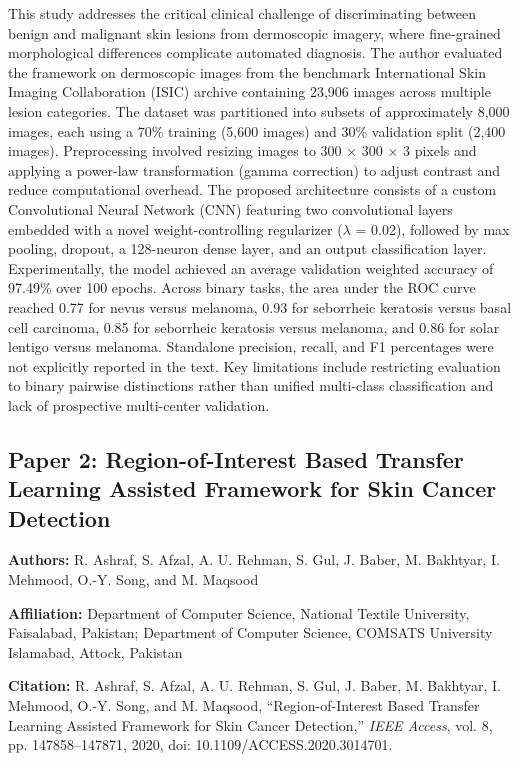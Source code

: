 \documentclass[conference]{IEEEtran}
\begin{document}
This study addresses the critical clinical challenge of discriminating between benign and malignant skin lesions from dermoscopic imagery, where fine-grained morphological differences complicate automated diagnosis. The author evaluated the framework on dermoscopic images from the benchmark International Skin Imaging Collaboration (ISIC) archive containing 23,906 images across multiple lesion categories. The dataset was partitioned into subsets of approximately 8,000 images, each using a 70\% training (5,600 images) and 30\% validation split (2,400 images). Preprocessing involved resizing images to 300 × 300 × 3 pixels and applying a power-law transformation (gamma correction) to adjust contrast and reduce computational overhead. The proposed architecture consists of a custom Convolutional Neural Network (CNN) featuring two convolutional layers embedded with a novel weight-controlling regularizer ($\lambda$ = 0.02), followed by max pooling, dropout, a 128-neuron dense layer, and an output classification layer. Experimentally, the model achieved an average validation weighted accuracy of 97.49\% over 100 epochs. Across binary tasks, the area under the ROC curve reached 0.77 for nevus versus melanoma, 0.93 for seborrheic keratosis versus basal cell carcinoma, 0.85 for seborrheic keratosis versus melanoma, and 0.86 for solar lentigo versus melanoma. Standalone precision, recall, and F1 percentages were not explicitly reported in the text. Key limitations include restricting evaluation to binary pairwise distinctions rather than unified multi-class classification and lack of prospective multi-center validation.

\subsection{Paper 2: Region-of-Interest Based Transfer Learning Assisted Framework for Skin Cancer Detection}

\textbf{Authors:} R. Ashraf, S. Afzal, A. U. Rehman, S. Gul, J. Baber, M. Bakhtyar, I. Mehmood, O.-Y. Song, and M. Maqsood

\textbf{Affiliation:} Department of Computer Science, National Textile University, Faisalabad, Pakistan; Department of Computer Science, COMSATS University Islamabad, Attock, Pakistan

\textbf{Citation:} R. Ashraf, S. Afzal, A. U. Rehman, S. Gul, J. Baber, M. Bakhtyar, I. Mehmood, O.-Y. Song, and M. Maqsood, ``Region-of-Interest Based Transfer Learning Assisted Framework for Skin Cancer Detection,'' \textit{IEEE Access}, vol. 8, pp. 147858--147871, 2020, doi: 10.1109/ACCESS.2020.3014701.
\end{document}
